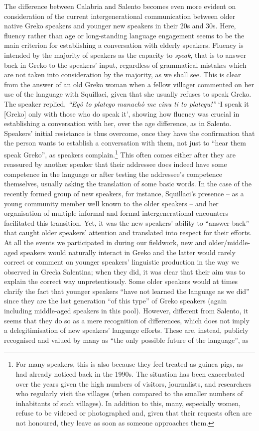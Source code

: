 \documentclass[output=paper,hidelinks]{langscibook}
\begin{document}
The difference between Calabria and Salento becomes even more evident on consideration of the current intergenerational communication between older native Greko speakers and younger new speakers in their 20s and 30s. Here, fluency rather than age or long-standing language engagement seems to be the main criterion for establishing a conversation with elderly speakers. Fluency is intended by the majority of speakers as the capacity to \textit{speak}, that is to answer back in Greko to the speakers’ input, regardless of grammatical mistakes which are not taken into consideration by the majority, as we shall see. This is clear from the answer of an old Greko woman when a fellow villager commented on her use of the language with Squillaci, given that she usually refuses to speak Greko. The speaker replied, \textit{“Egò to platego manachò me cinu ti to plategu!”} `I speak it [Greko] only with those who do speak it', showing how fluency was crucial in establishing a conversation with her, over the age difference, as in Salento. Speakers’ initial resistance is thus overcome, once they have the confirmation that the person wants to establish a conversation with them, not just to ``hear them speak Greko'', as speakers complain.\footnote{\textrm{For many speakers, this is also because they feel treated as guinea pigs, as \citet{Petropoulou1992} had already noticed back in the 1990s. The situation has been exacerbated over the years given the high numbers of visitors, journalists, and researchers who regularly visit the villages (when compared to the smaller numbers of inhabitants of such villages). In addition to this, many, especially women, refuse to be videoed or photographed and, given that their requests often are not honoured, they leave as soon as someone approaches them.}} This often comes either after they are reassured by another speaker that their addressee does indeed have some competence in the language or after testing the addressee’s competence themselves, usually asking the translation of some basic words. In the case of the recently formed group of new speakers, for instance, Squillaci’s presence -- as a young community member well known to the older speakers -- and her organisation of multiple informal and formal intergenerational encounters facilitated this transition. Yet, it was the new speakers’ ability to ``answer back'' that caught older speakers’ attention and translated into respect for their efforts. At all the events we participated in during our fieldwork, new and older/middle-aged speakers would naturally interact in Greko and the latter would rarely correct or comment on younger speakers’ linguistic production in the way we observed in Grecìa Salentina; when they did, it was clear that their aim was to explain the correct way unpretentiously. Some older speakers would at times clarify the fact that younger speakers ``have not learned the language as we did'' since they are the last generation ``of this type'' of Greko speakers (again including middle-aged speakers in this pool). However, different from Salento, it seems that they do so as a mere recognition of differences, which does not imply a delegitimisation of new speakers' language efforts. These are, instead, publicly recognised and valued by many as ``the only possible future of the language'', as 
\end{document}
